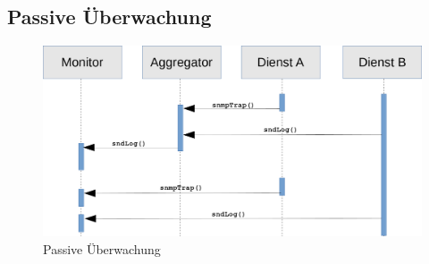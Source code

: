 \newpage
\subsection{Passive Überwachung}
\begin{figure}[htbp]
    \centering
    \includegraphics[scale=0.36]{img/sequence_uml_passive_trans}
    \caption{Passive Überwachung}
    \label{passiv}
\end{figure}
